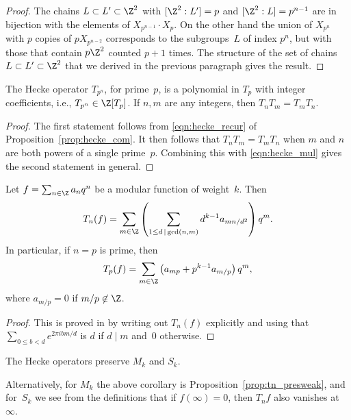 \begin{proof}
The chains $L\subset L'\subset\Z^2$ with $[\Z^2:L']=p$ and
$[\Z^2:L]=p^{n-1}$ are in bijection with the elements of
$X_{p^{n-1}}\cdot X_p$.  On the other hand the union of $X_{p^n}$ with
$p$ copies of $p X_{p^{n-2}}$ corresponds to the subgroups~$L$ of index
$p^{n}$, but with those that contain $p\Z^2$ counted $p+1$ times. The
structure of the set of chains $L\subset L'\subset\Z^2$ that we
derived in the previous paragraph gives the result.
\end{proof}

\begin{corollary}
The Hecke operator $T_{p^n}$, for prime~$p$, is a polynomial 
in $T_p$ with integer coefficients, i.e., $T_{p^n}\in\Z[T_p]$.
If $n,m$ are any integers, then $T_n T_m = T_m T_n$.
\end{corollary}
\begin{proof}
  The first statement follows from \eqref{eqn:hecke_recur}
  of Proposition~\ref{prop:hecke_com}. 
  It then follows that
  $T_n T_m = T_m T_n$ when $m$ and $n$ are both powers of a single prime~$p$.  Combining this with \eqref{eqn:hecke_mul} gives the second
  statement in general.
\end{proof}


\begin{proposition}\label{prop:qexpTn}
Let $f = \sum_{n\in\Z} a_n q^n$ be a modular function
of weight~$k$.
Then 
$$
   T_{n}(f)
     = \sum_{m\in\Z} 
\left(\sum_{1\leq d\,\mid\, \gcd(n,m)} d^{k-1} a_{mn/d^2}\right) q^m.
$$
In particular, if $n=p$ is prime, then
$$
  T_p(f) = \sum_{m\in \Z} \left(a_{mp} + p^{k-1} a_{m/p}\right) q^m,
$$
where $a_{m/p}=0$ if $m/p\not\in\Z$.
\end{proposition}
\begin{proof}
This is proved in \cite[\S
VII.5.3]{serre:arithmetic} by writing out $T_n(f)$ explicitly and
using that $\sum_{0\leq b<d} e^{2\pi i bm/d}$ is $d$ if $d\mid m$
and~$0$ otherwise. 
\end{proof}

\begin{corollary}\label{cor:tpres} 
 The Hecke operators preserve $M_k$ and $S_k$.
\end{corollary}
\begin{remark} Alternatively, for $M_k$ the above corollary is
  Proposition~\ref{prop:tn_presweak}, and for~$S_k$ we see from the
  definitions that if $f(\infty)=0$, then $T_n f$ also vanishes
  at~$\infty$.
\end{remark}

